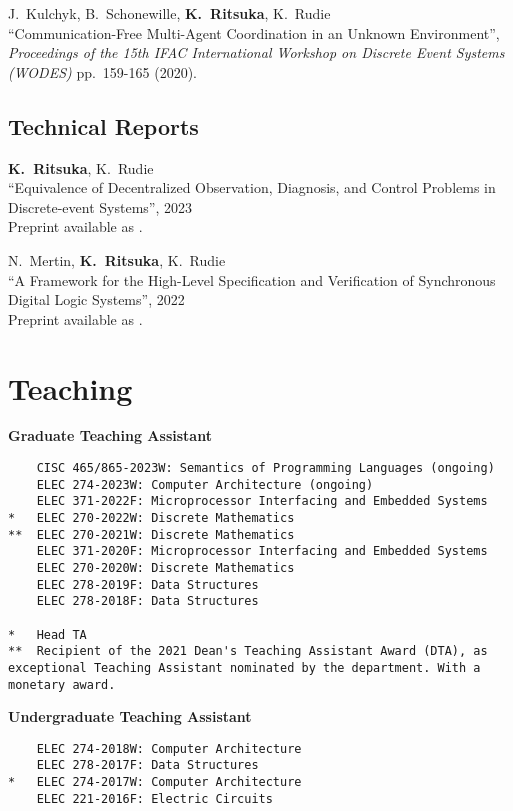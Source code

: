 \documentclass[margin]{res}
\begin{document}
\begin{resume}
J.~Kulchyk, B.~Schonewille, {\bf K.~Ritsuka}, K.~Rudie\\
``Communication-Free Multi-Agent Coordination in an Unknown Environment'',\\
\emph{Proceedings of the 15th IFAC International Workshop on Discrete Event Systems (WODES)}
pp.~159-165 (2020).

\subsection{Technical Reports}

{\bf K.~Ritsuka}, K.~Rudie\\
``Equivalence of Decentralized Observation, Diagnosis, and Control Problems in Discrete-event Systems'',
2023\\
Preprint available as .

N.~Mertin, {\bf K.~Ritsuka}, K.~Rudie\\
``A Framework for the High-Level Specification and Verification of Synchronous Digital Logic Systems'',
2022\\
Preprint available as .


\section{Teaching}

\textbf{Graduate Teaching Assistant}

\begin{lstlisting}
    CISC 465/865-2023W: Semantics of Programming Languages (ongoing)
    ELEC 274-2023W: Computer Architecture (ongoing)
    ELEC 371-2022F: Microprocessor Interfacing and Embedded Systems
*   ELEC 270-2022W: Discrete Mathematics
**  ELEC 270-2021W: Discrete Mathematics
    ELEC 371-2020F: Microprocessor Interfacing and Embedded Systems
    ELEC 270-2020W: Discrete Mathematics
    ELEC 278-2019F: Data Structures
    ELEC 278-2018F: Data Structures

*   Head TA
**  Recipient of the 2021 Dean's Teaching Assistant Award (DTA), as exceptional Teaching Assistant nominated by the department. With a monetary award.
\end{lstlisting}

\textbf{Undergraduate Teaching Assistant}

\begin{lstlisting}
    ELEC 274-2018W: Computer Architecture
    ELEC 278-2017F: Data Structures
*   ELEC 274-2017W: Computer Architecture
    ELEC 221-2016F: Electric Circuits


\end{lstlisting}
\end{resume}
\end{document}
